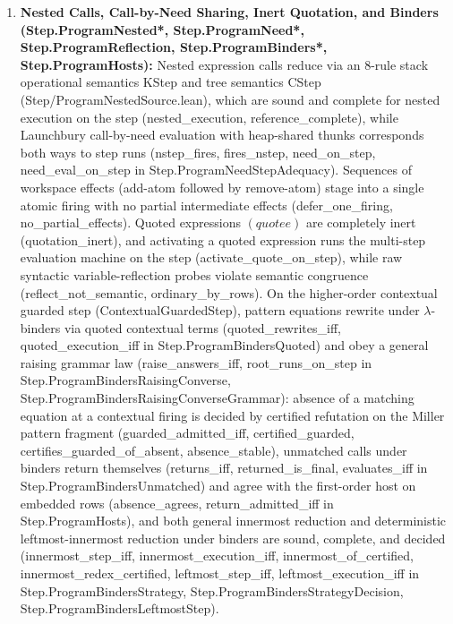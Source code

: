 \documentclass[11pt,a4paper]{article}
\theoremstyle{definition}
\DeclareRobustCommand{\lean}[1]{%
  \ifmmode\text{\normalfont\ttfamily\footnotesize\detokenize{#1}}%
  \else{\normalfont\footnotesize\leanurl{#1}}\fi}
\DeclareRobustCommand{\metta}[1]{\text{\normalfont\ttfamily\footnotesize #1}}
\def\lean#1{#1}%
\def\metta#1{#1}%
\begin{document}
\begin{enumerate}[leftmargin=2em, nosep]
  \item \textbf{Nested Calls, Call-by-Need Sharing, Inert Quotation, and Binders (\lean{Step.ProgramNested*}, \lean{Step.ProgramNeed*}, \lean{Step.ProgramReflection}, \lean{Step.ProgramBinders*}, \lean{Step.ProgramHosts}):}
  Nested expression calls reduce via an 8-rule stack operational semantics \lean{KStep} and tree semantics \lean{CStep} (\lean{Step/ProgramNestedSource.lean}), which are sound and complete for nested execution on the step (\lean{nested_execution}, \lean{reference_complete}), while Launchbury call-by-need evaluation with heap-shared thunks corresponds both ways to step runs (\lean{nstep_fires}, \lean{fires_nstep}, \lean{need_on_step}, \lean{need_eval_on_step} in \lean{Step.ProgramNeedStepAdequacy}). Sequences of workspace effects (\metta{add-atom} followed by \metta{remove-atom}) stage into a single atomic firing with no partial intermediate effects (\lean{defer_one_firing}, \lean{no_partial_effects}). Quoted expressions $\metta{(quote }e\metta{)}$ are completely inert (\lean{quotation_inert}), and activating a quoted expression runs the multi-step evaluation machine on the step (\lean{activate_quote_on_step}), while raw syntactic variable-reflection probes violate semantic congruence (\lean{reflect_not_semantic}, \lean{ordinary_by_rows}). On the higher-order contextual guarded step (\lean{ContextualGuardedStep}), pattern equations rewrite under $\lambda$-binders via quoted contextual terms (\lean{quoted_rewrites_iff}, \lean{quoted_execution_iff} in \lean{Step.ProgramBindersQuoted}) and obey a general raising grammar law (\lean{raise_answers_iff}, \lean{root_runs_on_step} in \lean{Step.ProgramBindersRaisingConverse}, \lean{Step.ProgramBindersRaisingConverseGrammar}): absence of a matching equation at a contextual firing is decided by certified refutation on the Miller pattern fragment (\lean{guarded_admitted_iff}, \lean{certified_guarded}, \lean{certifies_guarded_of_absent}, \lean{absence_stable}), unmatched calls under binders return themselves (\lean{returns_iff}, \lean{returned_is_final}, \lean{evaluates_iff} in \lean{Step.ProgramBindersUnmatched}) and agree with the first-order host on embedded rows (\lean{absence_agrees}, \lean{return_admitted_iff} in \lean{Step.ProgramHosts}), and both general innermost reduction and deterministic leftmost-innermost reduction under binders are sound, complete, and decided (\lean{innermost_step_iff}, \lean{innermost_execution_iff}, \lean{innermost_of_certified}, \lean{innermost_redex_certified}, \lean{leftmost_step_iff}, \lean{leftmost_execution_iff} in \lean{Step.ProgramBindersStrategy}, \lean{Step.ProgramBindersStrategyDecision}, \lean{Step.ProgramBindersLeftmostStep}).
\end{enumerate}
\end{document}
